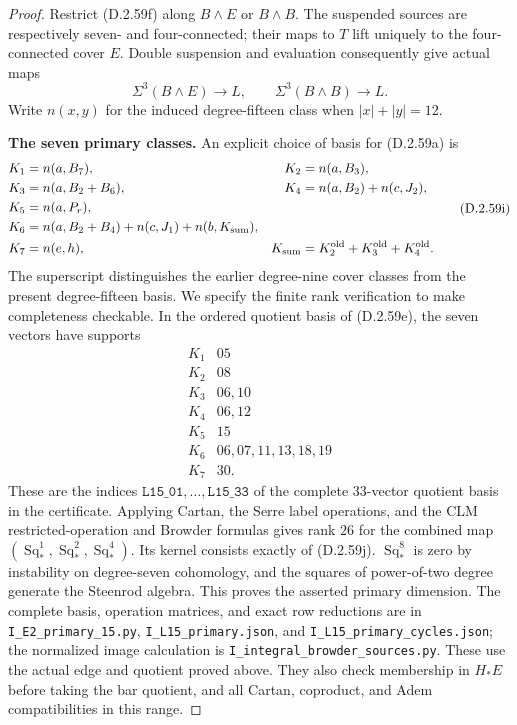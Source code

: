 \begin{proof}
Restrict \textup{(D.2.59f)} along $B\wedge E$ or $B\wedge B$.
The suspended sources are respectively seven- and four-connected;
their maps to $T$ lift uniquely to the four-connected cover $E$.
Double suspension and evaluation consequently give actual maps
\[
 \Sigma^3(B\wedge E)\longrightarrow L,
 \qquad \Sigma^3(B\wedge B)\longrightarrow L.
 \tag{D.2.59h}
\]
Write $n(x,y)$ for the induced degree-fifteen class when
$|x|+|y|=12$.

\textbf{The seven primary classes.}
An explicit choice of basis for \textup{(D.2.59a)} is
\[
 \begin{aligned}
 K_1&=n(a,B_7),&K_2&=n(a,B_3),\\
 K_3&=n(a,B_2+B_6),&K_4&=n(a,B_2)+n(c,J_2),\\
 K_5&=n(a,P_r),\\
 K_6&=n(a,B_2+B_4)+n(c,J_1)+n(b,K_{\rm sum}),\\
 K_7&=n(e,h),&K_{\rm sum}&=K_2^{\rm old}+K_3^{\rm old}+K_4^{\rm old}.
 \end{aligned}
 \tag{D.2.59i}
\]
The superscript distinguishes the earlier degree-nine cover
classes from the present degree-fifteen basis.
We specify the finite rank verification to make completeness
checkable.  In the ordered quotient basis of
\textup{(D.2.59e)}, the seven vectors have supports
\[
 \begin{array}{c|l}
 K_1&05\\K_2&08\\K_3&06,10\\K_4&06,12\\K_5&15\\
 K_6&06,07,11,13,18,19\\K_7&30.
 \end{array}
 \tag{D.2.59j}
\]
These are the indices $\texttt{L15\_01},\ldots,\texttt{L15\_33}$
of the complete $33$-vector quotient basis in the certificate.
Applying Cartan, the Serre label operations, and the CLM
restricted-operation and Browder formulas gives rank $26$ for
the combined map $(\operatorname{Sq}_*^1,
\operatorname{Sq}_*^2,\operatorname{Sq}_*^4)$.
Its kernel consists exactly of \textup{(D.2.59j)}.
$\operatorname{Sq}_*^8$ is zero by instability on degree-seven
cohomology, and the squares of power-of-two degree generate the
Steenrod algebra.  This proves the asserted primary dimension.
The complete basis, operation matrices, and exact row reductions
are in \texttt{I\_E2\_primary\_15.py},
\texttt{I\_L15\_primary.json}, and
\texttt{I\_L15\_primary\_cycles.json}; the normalized image
calculation is \texttt{I\_integral\_browder\_sources.py}.
These use the actual edge and quotient proved above.  They also
check membership in $H_*E$ before taking the bar quotient,
and all Cartan, coproduct, and Adem compatibilities in this range.


\end{proof}
